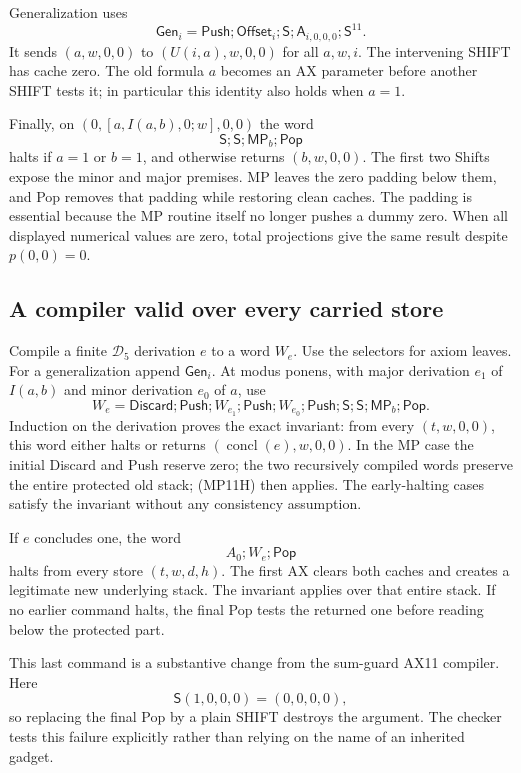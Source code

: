 Generalization uses
\[
 \mathsf{Gen}_i=\mathsf{Push};\mathsf{Offset}_i;\mathsf S;
                \mathsf A_{i,0,0,0};\mathsf S^{11}.
\]
It sends $(a,w,0,0)$ to $(U(i,a),w,0,0)$ for all $a,w,i$.
The intervening SHIFT has cache zero.  The old formula $a$ becomes an
AX parameter before another SHIFT tests it; in particular this identity
also holds when $a=1$.

Finally, on $(0,[a,I(a,b),0;w],0,0)$ the word
\[
 \mathsf S;\mathsf S;\mathsf{MP}_b;\mathsf{Pop}
 \tag{MP11H}
\]
halts if $a=1$ or $b=1$, and otherwise returns $(b,w,0,0)$.
The first two Shifts expose the minor and major premises.  MP leaves
the zero padding below them, and Pop removes that padding while restoring
clean caches.  The padding is essential because the MP routine itself
no longer pushes a dummy zero.  When all displayed numerical values are
zero, total projections give the same result despite $p(0,0)=0$.

\subsection{A compiler valid over every carried store}

Compile a finite $\mathcal D_5$ derivation $e$ to a word $W_e$.
Use the selectors for axiom leaves.  For a generalization append
$\mathsf{Gen}_i$.  At modus ponens, with major derivation $e_1$ of
$I(a,b)$ and minor derivation $e_0$ of $a$, use
\[
 W_e=\mathsf{Discard};\mathsf{Push};W_{e_1};\mathsf{Push};
 W_{e_0};\mathsf{Push};\mathsf S;\mathsf S;
 \mathsf{MP}_b;\mathsf{Pop}.
 \tag{COMP11H}
\]
Induction on the derivation proves the exact invariant:
from every $(t,w,0,0)$, this word either halts or returns
$(\operatorname{concl}(e),w,0,0)$.  In the MP case the initial
Discard and Push reserve zero; the two recursively compiled words
preserve the entire protected old stack; (MP11H) then applies.
The early-halting cases satisfy the invariant without any consistency
assumption.

If $e$ concludes one, the word
\[
                 A_0;W_e;\mathsf{Pop}
 \tag{HALT11H}
\]
halts from every store $(t,w,d,h)$.  The first AX clears both caches
and creates a legitimate new underlying stack.  The invariant applies
over that entire stack.  If no earlier command halts, the final Pop
tests the returned one before reading below the protected part.

This last command is a substantive change from the sum-guard AX11
compiler.  Here
\[
 \mathsf S(1,0,0,0)=(0,0,0,0),
\]
so replacing the final Pop by a plain SHIFT destroys the argument.
The checker tests this failure explicitly rather than relying on the
name of an inherited gadget.

